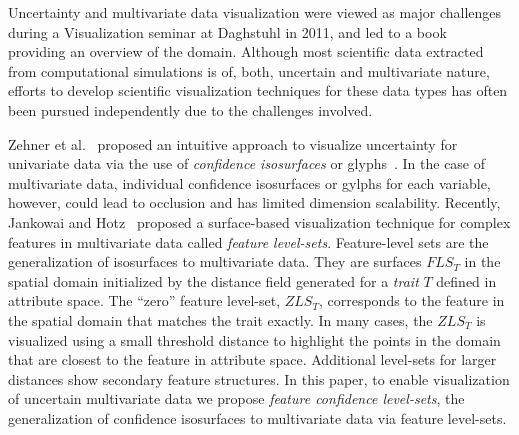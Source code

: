 %
Uncertainty and multivariate data visualization were viewed as major challenges during a Visualization seminar at Daghstuhl in 2011, and led to a book~\cite{hansen2014scientific} providing an overview of the domain. 
%
Although most scientific data extracted from computational simulations is of, both, uncertain and multivariate nature, efforts to develop scientific visualization techniques for these data types has often been pursued independently due to the challenges involved.
%

Zehner et al.~\cite{zehner2010visualization} proposed an intuitive approach to visualize uncertainty for univariate data via the use of \textit{confidence isosurfaces} or glyphs~\cite{zehner2010visualization}.
%
In the case of multivariate data, individual confidence isosurfaces or gylphs for each variable, however, could lead to occlusion and has limited dimension scalability.
%
Recently, Jankowai and Hotz~\cite{jankowai2020feature} proposed a surface-based visualization technique for complex features in multivariate data called \textit{feature level-sets}. 
%
Feature-level sets are the generalization of isosurfaces to multivariate data.
%
They are surfaces $FLS_{T}$ in the spatial domain initialized by the distance field generated for a \textit{trait} $T$ defined in attribute space.
%
The ``zero'' feature level-set, $ZLS_{T}$, corresponds to the feature in the spatial domain that matches the trait exactly.
%
In many cases, the $ZLS_{T}$ is visualized using a small threshold distance to highlight the points in the domain that are closest to the feature in attribute space.
%
Additional level-sets for larger distances show secondary feature structures.
%
In this paper, to enable visualization of uncertain multivariate data we propose \textit{feature confidence level-sets}, the generalization of confidence isosurfaces to multivariate data via feature level-sets. 

